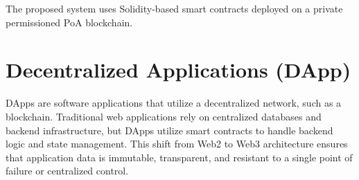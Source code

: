 The proposed system uses Solidity-based smart contracts deployed on a private permissioned \ac{PoA} blockchain.

\section{Decentralized Applications (\ac{DApp})}

\ac{DApp}s are software applications that utilize a decentralized network, such as a blockchain. Traditional web applications rely on centralized databases and backend infrastructure, but \ac{DApp}s utilize smart contracts to handle backend logic and state management. This shift from Web2 to Web3 architecture ensures that application data is immutable, transparent, and resistant to a single point of failure or centralized control.

%

